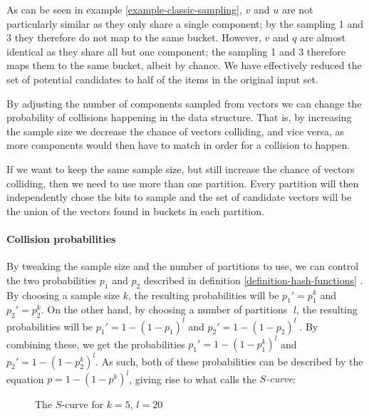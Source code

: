 As can be seen in example \ref{example-classic-sampling}, $v$ and $u$ are not particularly similar as they only share a single component; by the sampling 1 and 3 they therefore do not map to the same bucket. However, $v$ and $q$ are almost identical as they share all but one component; the sampling 1 and 3 therefore maps them to the same bucket, albeit by chance. We have effectively reduced the set of potential candidates to half of the items in the original input set.

By adjusting the number of components sampled from vectors we can change the probability of collisions happening in the data structure. That is, by increasing the sample size we decrease the chance of vectors colliding, and vice versa, as more components would then have to match in order for a collision to happen.

If we want to keep the same sample size, but still increase the chance of vectors colliding, then we need to use more than one partition. Every partition will then independently chose the bits to sample and the set of candidate vectors will be the union of the vectors found in buckets in each partition.

\paragraph{Collision probabilities} By tweaking the sample size and the number of partitions to use, we can control the two probabilities $p_1$ and $p_2$ described in definition \ref{definition-hash-functions} \cite[p. 101]{DBLP:books/cu/LeskovecRU14}. By choosing a sample size $k$, the resulting probabilities will be $p_1' = p_1^k$ and  $p_2' = p_2^k$. On the other hand, by choosing a number of partitions 􏰄$l$, the resulting probabilities will be $p_1' = 1 - (1 - p_1)^l$ and $p_2' = 1 - (1 - p_2)^l􏰅$. By combining these, we get the probabilities $p_1' = 1 - (1 - p_1^k)^l$ and $p_2' = 1 - (1 - p_2^k)^l$. As such, both of these probabilities can be described by the equation $p = 1 - (1 - p^k)^l$, giving rise to what \cite[p. 89]{DBLP:books/cu/LeskovecRU14} calls the \textit{$S$-curve}:

\begin{figure}[ht]

  \caption{The $S$-curve for $k = 5$, $l = 20$}
\end{figure}

